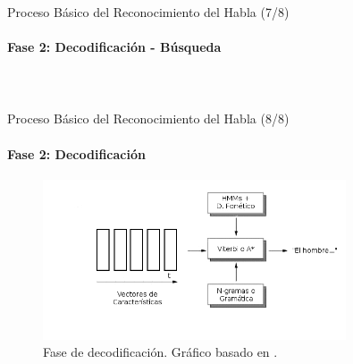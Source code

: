 \begin{frame}{Proceso B\'asico del Reconocimiento del Habla (7/8)}
\framesubtitle{Fase 2: Decodificaci\'on - B\'usqueda}

\begin{columns}

\begin{figure}[H]
\centering
{}
\label{figure:espacio-busqueda}
\end{figure}
\end{columns}


\end{frame}


\begin{frame}{Proceso B\'asico del Reconocimiento del Habla (8/8)}
\framesubtitle{Fase 2: Decodificaci\'on}
\begin{figure}[H] 
\centering
\includegraphics[width=0.8\textwidth]{./graphics/decodificacion.png}
\caption{Fase de decodificaci\'on. Gr\'afico basado en \cite{VerenichASR}.}
\label{figure:decoding}
\end{figure}
\end{frame}
